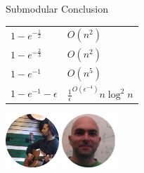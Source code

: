 \begin{frame}{Submodular Conclusion}
    \begin{center}
        \Large
        \begin{tabular}{l l}
            \hline
            $1 - e^{-\frac{1}{2}}$ & $O(n^2)$
            \\
            \color{orange}$1 - e^{-\frac{2}{3}}$ & \color{orange}$O(n^2)$
            \\
            $1 - e^{-1}$ & $O(n^5)$
            \\
            $1 - e^{-1} - \epsilon$ & $\frac{1}{\epsilon}^{O(\epsilon^{-4})}n \log^2 n$
            \\
            \hline
        \end{tabular}
        
        \vfill
        
        \includegraphics[height=2cm]{ariel.png}
        \includegraphics[height=2cm]{roy.png}
        
    \end{center}
\end{frame}